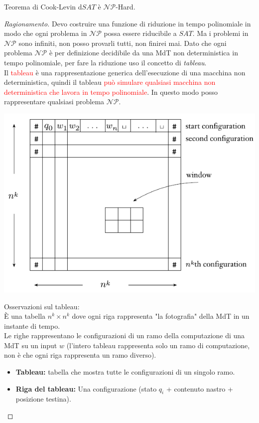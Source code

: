 \documentclass{article}  %
\theoremstyle{definition}
\newenvironment{ragionamento}[1][]
  {\begin{proof}[Ragionamento#1]\renewcommand{\qedsymbol}{}\normalfont}
  {\end{proof}}
\begin{document}
\begin{theorem}{Teorema di Cook-Levin}
	d$SAT$ è $\mathcal{NP}$-Hard.
	\footnotesize
	\begin{ragionamento}
		Devo costruire una funzione di riduzione in tempo polinomiale in modo che ogni problema in $\mathcal{NP}$ possa essere riducibile a $SAT$. Ma i problemi in $\mathcal{NP}$
		sono infiniti, non posso provarli tutti, non finirei mai. Dato che ogni problema $\mathcal{NP}$ è per definizione decidibile da una MdT non deterministica in tempo polinomiale,
		per fare la riduzione uso il concetto di \textit{tableau}. \\
		Il \textcolor{red}{tableau} è una rappresentazione generica dell'esecuzione di una macchina non deterministica, quindi il tableau \textcolor{red}{può simulare qualsiasi macchina
			non deterministica che lavora in tempo polinomiale}. In questo modo posso rappresentare qualsiasi problema $\mathcal{NP}$.
		\begin{center}
			\includegraphics[width=0.8\linewidth]{tableau.png}
		\end{center}
		Osservazioni sul tableau: \\
		È una tabella $n^k \times n^k$ dove ogni riga rappresenta "la fotografia" della MdT in un instante di tempo. \\ Le righe rappresentano le configurazioni di un ramo della computazione
		di una MdT su un input $w$ (l'intero tableau rappresenta solo un ramo di computazione, non è che ogni riga rappresenta
		un ramo diverso).
		\begin{itemize}
			\item \textbf{Tableau:} tabella che mostra tutte le configurazioni di un singolo ramo.
			\item  \textbf{Riga del tableau:} Una configurazione (stato $q_i$ + contenuto nastro + posizione testina).

\end{itemize}
\end{ragionamento}
\end{theorem}
\end{document}
